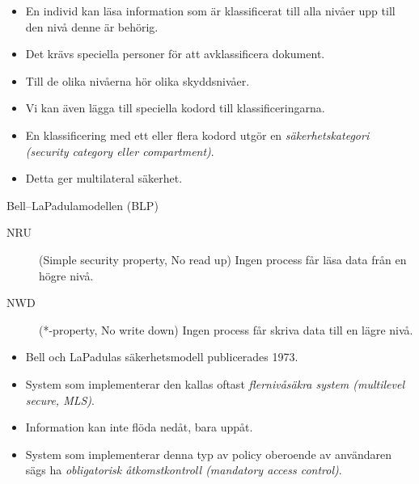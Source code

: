 \documentclass{beamer}
\begin{document}
\begin{frame}{\insertsubsectionhead}
  \begin{itemize}
    \item En individ kan läsa information som är klassificerat till alla nivåer 
      upp till den nivå denne är behörig.
    \item Det krävs speciella personer för att avklassificera dokument.
    \item Till de olika nivåerna hör olika skyddsnivåer.
  \end{itemize}
\end{frame}
\begin{frame}{\insertsubsectionhead}
  \begin{itemize}
    \item Vi kan även lägga till speciella kodord till klassificeringarna.
    \item En klassificering med ett eller flera kodord utgör en 
      \emph{säkerhetskategori (security category eller compartment)}.
    \item Detta ger multilateral säkerhet.
  \end{itemize}
\end{frame}
\begin{frame}{\insertsubsectionhead}
  \begin{block}{Bell--LaPadulamodellen (BLP)}
    \begin{description}
      \item[NRU] (Simple security property, No read up) Ingen process får läsa 
        data från en högre nivå.
      \item[NWD] (*-property, No write down) Ingen process får skriva data till 
        en lägre nivå.
    \end{description}
  \end{block}
  \begin{itemize}
    \item Bell och LaPadulas säkerhetsmodell publicerades 1973.
    \item System som implementerar den kallas oftast \emph{flernivåsäkra system 
      (multilevel secure, MLS)}.
    \item Information kan inte flöda nedåt, bara uppåt.
    \item System som implementerar denna typ av policy oberoende av användaren 
      sägs ha \emph{obligatorisk åtkomstkontroll (mandatory access control)}.
  \end{itemize}
\end{frame}
\end{document}
